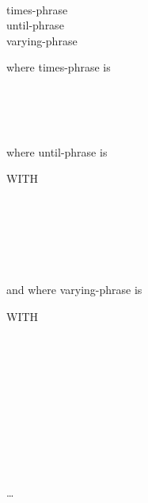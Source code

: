 \begin{0-1}
   \\
  times-phrase \\
  until-phrase \\
  varying-phrase
\end{0-1}
\imperativestatement
\begin{0-1}
\end{0-1}

where times-phrase is

\begin{1=}
  \identifier \\
  \literal \\
  \functionname
\end{1=}
 \\

where until-phrase is

\begin{0-1}
  WITH 
  \begin{1=}
     \\
     \\
  \end{1=}
\end{0-1}
\begin{1=}
  \condition \\
\end{1=} \\

and where varying-phrase is

\begin{0-1}
  WITH 
  \begin{1=}
     \\
     \\
  \end{1=}
\end{0-1}

 \identifier {}
\begin{1=}
  \identifier \\
  \literal
\end{1=}
\begin{1=}
  \identifier \\
  \literal
\end{1=}
\condition

\begin{0-1}
   \identifier {}
  \begin{1=}
    \identifier \\
    \literal
  \end{1=}
  \begin{1=}
    \identifier \\
    \literal
  \end{1=}

  \condition
\end{0-1} \ldots


